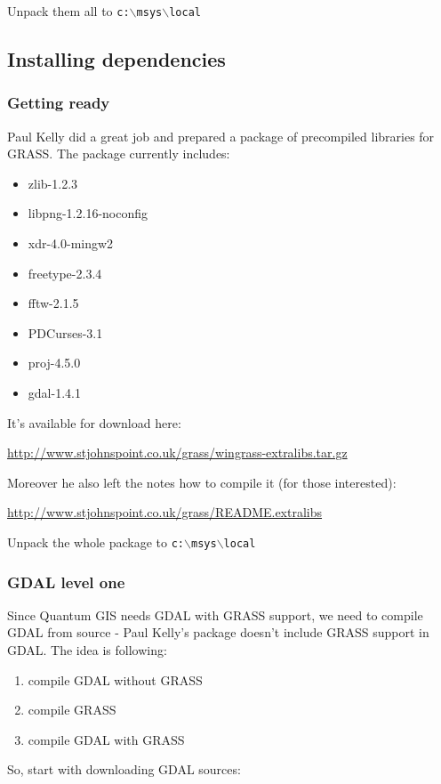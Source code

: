 Unpack them all to \texttt{c:$\backslash$msys$\backslash$local}

\subsection{Installing dependencies}
\subsubsection{Getting ready}
Paul Kelly did a great job and prepared a package of precompiled libraries for GRASS.
The package currently includes:

\begin{itemize}
\item zlib-1.2.3
\item libpng-1.2.16-noconfig
\item xdr-4.0-mingw2
\item freetype-2.3.4
\item fftw-2.1.5
\item PDCurses-3.1
\item proj-4.5.0
\item gdal-1.4.1
\end{itemize}

It's available for download here:

\url{http://www.stjohnspoint.co.uk/grass/wingrass-extralibs.tar.gz}

Moreover he also left the notes how to compile it (for those interested):

\url{http://www.stjohnspoint.co.uk/grass/README.extralibs}

Unpack the whole package to \texttt{c:$\backslash$msys$\backslash$local}

\subsubsection{GDAL level one}
Since Quantum GIS needs GDAL with GRASS support, we need to compile GDAL
from source - Paul Kelly's package doesn't include GRASS support in GDAL.
The idea is following:

\begin{enumerate}
\item compile GDAL without GRASS
\item compile GRASS
\item compile GDAL with GRASS
\end{enumerate}

So, start with downloading GDAL sources:

